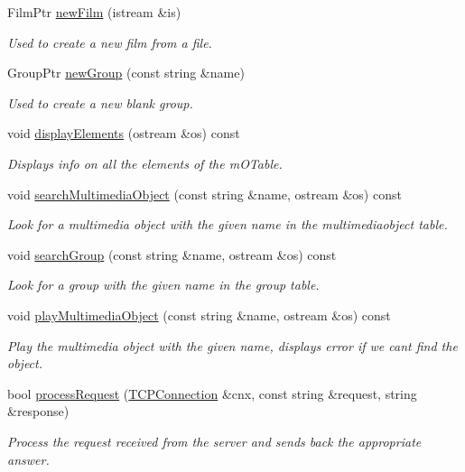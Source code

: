 \begin{DoxyCompactItemize}
Film\+Ptr \hyperlink{classData_aa14f12c39b4d568353606420b691296f}{new\+Film} (istream \&is)
\begin{DoxyCompactList}\small\item\em Used to create a new film from a file. \end{DoxyCompactList}\item 
Group\+Ptr \hyperlink{classData_a94d766d884a27444fdca887a60e1162c}{new\+Group} (const string \&name)
\begin{DoxyCompactList}\small\item\em Used to create a new blank group. \end{DoxyCompactList}\item 
void \hyperlink{classData_a792f2e1f05c9d068892aad4940e27ff6}{display\+Elements} (ostream \&os) const 
\begin{DoxyCompactList}\small\item\em Displays info on all the elements of the m\+O\+Table. \end{DoxyCompactList}\item 
void \hyperlink{classData_ada79ae2968738413d48250a684ae63ec}{search\+Multimedia\+Object} (const string \&name, ostream \&os) const 
\begin{DoxyCompactList}\small\item\em Look for a multimedia object with the given name in the multimediaobject table. \end{DoxyCompactList}\item 
void \hyperlink{classData_ae4df938ba31a8359006e824a880559b3}{search\+Group} (const string \&name, ostream \&os) const 
\begin{DoxyCompactList}\small\item\em Look for a group with the given name in the group table. \end{DoxyCompactList}\item 
void \hyperlink{classData_a627fcf83d707dd0cef70245fe7785f4f}{play\+Multimedia\+Object} (const string \&name, ostream \&os) const 
\begin{DoxyCompactList}\small\item\em Play the multimedia object with the given name, displays error if we can\textquotesingle{}t find the object. \end{DoxyCompactList}\item 
bool \hyperlink{classData_a1e03c91a77ed0555dae82727dfcc8df9}{process\+Request} (\hyperlink{classcppu_1_1TCPConnection}{T\+C\+P\+Connection} \&cnx, const string \&request, string \&response)
\begin{DoxyCompactList}\small\item\em Process the request received from the server and sends back the appropriate answer. \end{DoxyCompactList}\item 

\end{DoxyCompactItemize}

